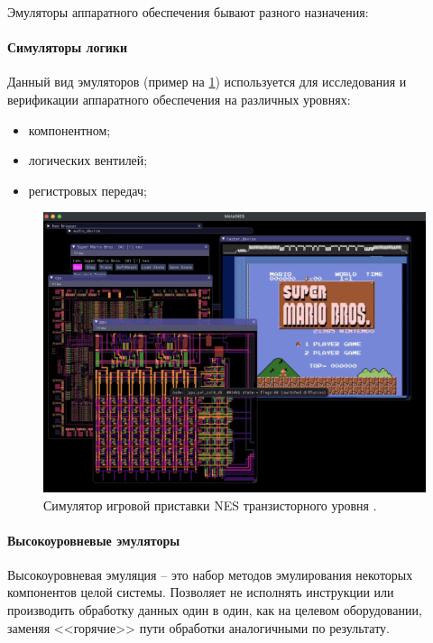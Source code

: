 Эмуляторы аппаратного обеспечения бывают разного назначения:

\paragraph{Симуляторы логики}\label{logic-sim}

Данный вид эмуляторов (пример на \cref{fig:metal-nes})
используется для исследования и верификации аппаратного обеспечения на различных уровнях:
\begin{itemize}
    \item компонентном;
    \item логических вентилей;
    \item регистровых передач;
\end{itemize}


\begin{figure}[!htbp]
    \centering
    \begin{adjustbox}{max totalsize={0.8\textwidth}{\textheight}}
        \includegraphics[]{images/metal-nes.png}
    \end{adjustbox}
    \caption{Симулятор игровой приставки NES транзисторного уровня \cite{metalnes}.}\label{fig:metal-nes}
\end{figure}

\paragraph{Высокоуровневые эмуляторы}\label{high-level-emu}

Высокоуровневая эмуляция -- это набор методов эмулирования некоторых компонентов целой системы.
Позволяет не исполнять инструкции или производить обработку данных один в один, как на целевом оборудовании,
заменяя <<горячие>> пути обработки аналогичными по результату.

